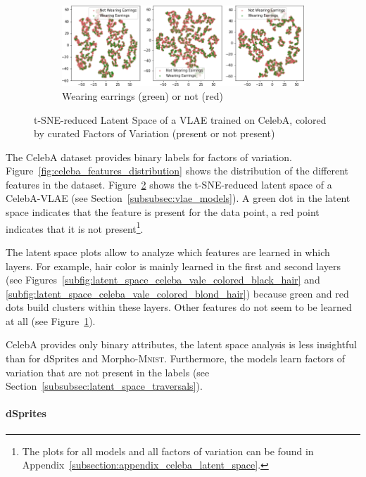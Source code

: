 \begin{figure}
\begin{subfigure}{.49\textwidth}
        \includegraphics[width=\textwidth]{images/latent_spaces/celeba/vlae/vlae_celeba_Wearing_Earrings.png}
        \caption{Wearing earrings (green) or not (red)}
        \label{subfig:latent_space_celeba_vale_colored_wearing_earrings}
    \end{subfigure}
    \caption[VLAE Latent Space for CelebA, Curated Features]{\ac{t-SNE}-reduced Latent Space of a \ac{VLAE} trained on CelebA, colored by curated Factors of Variation (present or not present)}
    \label{fig:latent_space_celeba_vale_colored}
\end{figure}

The CelebA dataset provides binary labels for factors of variation.
Figure~\ref{fig:celeba_features_distribution} shows the distribution of the different features in the dataset.
Figure~\ref{fig:latent_space_celeba_vale_colored} shows the \ac{t-SNE}-reduced latent space of a CelebA-\ac{VLAE} (see Section~\ref{subsubsec:vlae_models}).
A green dot in the latent space indicates that the feature is present for the data point, a red point indicates that it is not present\footnote{The plots for all models and all factors of variation can be found in Appendix~\ref{subsection:appendix_celeba_latent_space}.}.

The latent space plots allow to analyze which features are learned in which layers.
For example, hair color is mainly learned in the first and second layers (see Figures~\ref{subfig:latent_space_celeba_vale_colored_black_hair} and \ref{subfig:latent_space_celeba_vale_colored_blond_hair}) because green and red dots build clusters within these layers.
Other features do not seem to be learned at all (see Figure~\ref{subfig:latent_space_celeba_vale_colored_wearing_earrings}).

CelebA provides only binary attributes, the latent space analysis is less insightful than for dSprites and Morpho-\textsc{Mnist}.
Furthermore, the models learn factors of variation that are not present in the labels (see Section~\ref{subsubsec:latent_space_traversals}).

\paragraph{dSprites}

